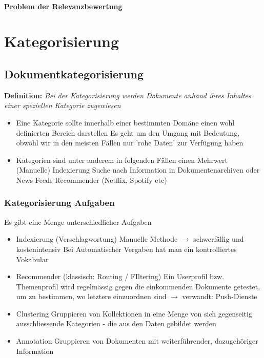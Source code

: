 \documentclass{report}
\theoremstyle{definition}
\theoremstyle{example}
\begin{document}
\subsubsection{Problem der Relevanzbewertung}


\chapter{Kategorisierung}

\section{Dokumentkategorisierung}
\textbf{Definition:} \textit{Bei der Kategorisierung werden Dokumente anhand ihres Inhaltes einer speziellen Kategorie zugewiesen}
\begin{itemize}
   \item Eine Kategorie sollte innerhalb einer bestimmten Domäne einen wohl definierten Bereich darstellen
   \subitem Es geht um den Umgang mit Bedeutung, obwohl wir in den meisten Fällen nur 'rohe Daten' zur Verfügung haben 
   \item Kategorien sind unter anderem in folgenden Fällen einen Mehrwert
   \subitem (Manuelle) Indexierung
   \subitem Suche nach Information in Dokumentenarchiven oder News Feeds
   \subitem Recommender (Netflix, Spotify etc) 
\end{itemize}

\subsection{Kategorisierung Aufgaben}
Es gibt eine Menge unterschiedlicher Aufgaben
\begin{itemize}
   \item Indexierung (Verschlagwortung)
   \subitem Manuelle Methode $\rightarrow$ schwerfällig und kostenintensiv
   \subitem Bei Automatischer Vergaben hat man ein kontrolliertes Vokabular 
   \item Recommender (klassisch: Routing / FIltering)
   \subitem Ein Userprofil bzw. Themenprofil wird regelmässig gegen die einkommenden Dokumente getestet, um zu bestimmen, wo letztere einzuordnen sind $\rightarrow$ verwandt: Push-Dienste
   \item Clustering
   \subitem Gruppieren von Kollektionen in eine Menge von sich gegenseitig ausschliessende Kategorien - die aus den Daten gebildet werden 
   \item Annotation 
   \subitem Gruppieren von Dokumenten mit weiterführender, dazugehöriger Information 
\end{itemize}
\end{document}

